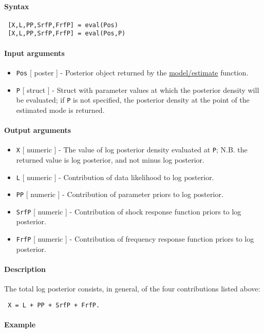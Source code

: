 


	\paragraph{Syntax}
 
 \begin{verbatim}
 [X,L,PP,SrfP,FrfP] = eval(Pos)
 [X,L,PP,SrfP,FrfP] = eval(Pos,P)
 \end{verbatim}
 
 \paragraph{Input arguments}
 
 \begin{itemize}
 \item
   \texttt{Pos} {[} poster {]} - Posterior object returned by the
   \url{model/estimate} function.
 \item
   \texttt{P} {[} struct {]} - Struct with parameter values at which the
   posterior density will be evaluated; if \texttt{P} is not specified,
   the posterior density at the point of the estimated mode is returned.
 \end{itemize}
 
 \paragraph{Output arguments}
 
 \begin{itemize}
 \item
   \texttt{X} {[} numeric {]} - The value of log posterior density
   evaluated at \texttt{P}; N.B. the returned value is log posterior, and
   not minus log posterior.
 \item
   \texttt{L} {[} numeric {]} - Contribution of data likelihood to log
   posterior.
 \item
   \texttt{PP} {[} numeric {]} - Contribution of parameter priors to log
   posterior.
 \item
   \texttt{SrfP} {[} numeric {]} - Contribution of shock response
   function priors to log posterior.
 \item
   \texttt{FrfP} {[} numeric {]} - Contribution of frequency response
   function priors to log posterior.
 \end{itemize}
 
 \paragraph{Description}
 
 The total log posterior consists, in general, of the four contributions
 listed above:
 
 \begin{verbatim}
 X = L + PP + SrfP + FrfP.
 \end{verbatim}
 
 \paragraph{Example}


